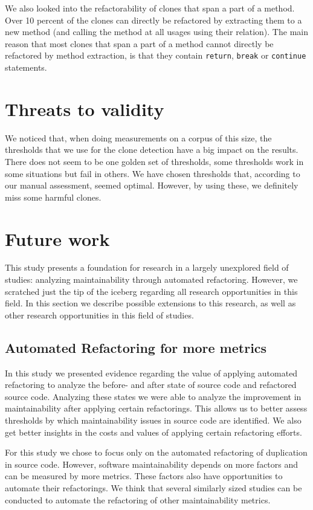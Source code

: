 We also looked into the refactorability of clones that span a part of a method. Over 10 percent of the clones can directly be refactored by extracting them to a new method (and calling the method at all usages using their relation). The main reason that most clones that span a part of a method cannot directly be refactored by method extraction, is that they contain \texttt{return}, \texttt{break} or \texttt{continue} statements.

\section{Threats to validity}\label{chap:threatstovalidity}
We noticed that, when doing measurements on a corpus of this size, the thresholds that we use for the clone detection have a big impact on the results. There does not seem to be one golden set of thresholds, some thresholds work in some situations but fail in others. We have chosen thresholds that, according to our manual assessment, seemed optimal. However, by using these, we definitely miss some harmful clones.

\section{Future work} \label{sec:future_work}
This study presents a foundation for research in a largely unexplored field of studies: analyzing maintainability through automated refactoring. However, we scratched just the tip of the iceberg regarding all research opportunities in this field. In this section we describe possible extensions to this research, as well as other research opportunities in this field of studies.

\subsection{Automated Refactoring for more metrics}
In this study we presented evidence regarding the value of applying automated refactoring to analyze the before- and after state of source code and refactored source code. Analyzing these states we were able to analyze the improvement in maintainability after applying certain refactorings. This allows us to better assess thresholds by which maintainability issues in source code are identified. We also get better insights in the costs and values of applying certain refactoring efforts.

For this study we chose to focus only on the automated refactoring of duplication in source code. However, software maintainability depends on more factors and can be measured by more metrics. These factors also have opportunities to automate their refactorings. We think that several similarly sized studies can be conducted to automate the refactoring of other maintainability metrics.

